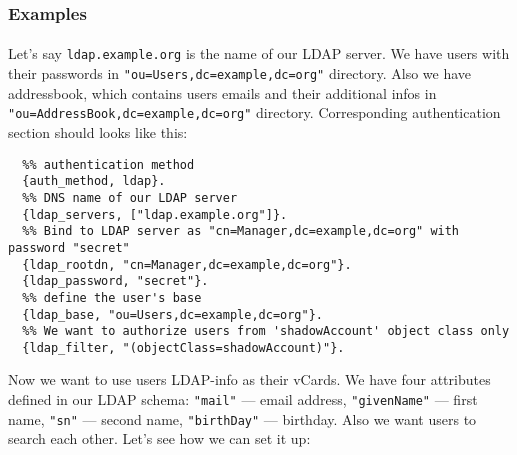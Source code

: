 \documentclass[a4paper,10pt]{book}
\newcommand{\term}[1]{\texttt{#1}}
\begin{document}
\subsubsection{Examples}
\label{ldapexamples}

\paragraph{}

Let's say \term{ldap.example.org} is the name of our LDAP server. We have
users with their passwords in \term{"ou=Users,dc=example,dc=org"} directory.
Also we have addressbook, which contains users emails and their additional
infos in \term{"ou=AddressBook,dc=example,dc=org"} directory.  Corresponding
authentication section should looks like this:

\begin{verbatim}
  %% authentication method
  {auth_method, ldap}.
  %% DNS name of our LDAP server
  {ldap_servers, ["ldap.example.org"]}.
  %% Bind to LDAP server as "cn=Manager,dc=example,dc=org" with password "secret"
  {ldap_rootdn, "cn=Manager,dc=example,dc=org"}.
  {ldap_password, "secret"}.
  %% define the user's base
  {ldap_base, "ou=Users,dc=example,dc=org"}.
  %% We want to authorize users from 'shadowAccount' object class only
  {ldap_filter, "(objectClass=shadowAccount)"}.
\end{verbatim}

Now we want to use users LDAP-info as their vCards.  We have four attributes
defined in our LDAP schema: \term{"mail"} --- email address, \term{"givenName"}
--- first name, \term{"sn"} --- second name, \term{"birthDay"} --- birthday.
Also we want users to search each other.  Let's see how we can set it up:
\end{document}
